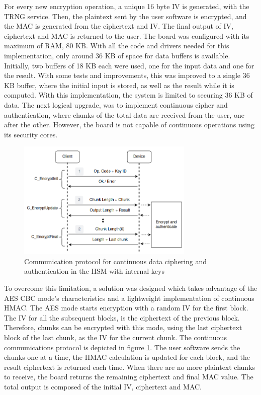 For every new encryption operation, a unique 16 byte \ac{IV} is generated, with the \ac{TRNG} service.
Then, the plaintext sent by the user software is encrypted, and the MAC is generated from the ciphertext and IV. The final output of IV, ciphertext and MAC is returned to the user.
The board was configured with its maximum of RAM, 80 KB. With all the code and drivers needed for this implementation, only around 36 KB of space for data buffers is available. Initially, two buffers of 18 KB each were used, one for the input data and one for the result. With some tests and improvements, this was improved to a single 36 KB buffer, where the initial input is stored, as well as the result while it is computed. With this implementation, the system is limited to securing 36 KB of data. The next logical upgrade, was to implement continuous cipher and authentication, where chunks of the total data are received from the user, one after the other. However, the board is not capable of continuous operations using its security cores.
\begin{figure}[h!]
	\centering
	\includegraphics[width=0.75\textwidth]{./Images/data-exchange-chunks.png}
	\caption{Communication protocol for continuous data ciphering and authentication in the HSM with internal keys}
	\label{fig:protocol:data-exchange-chunks}
\end{figure}
To overcome this limitation, a solution was designed which takes advantage of the AES \ac{CBC} mode's characteristics and a lightweight implementation of continuous \ac{HMAC}. The \ac{AES} mode starts encryption with a random IV for the first block. The IV for all the subsequent blocks, is the ciphertext of the previous block. Therefore, chunks can be encrypted with this mode, using the last ciphertext block of the last chunk, as the IV for the current chunk. The continuous communications protocol is depicted in figure \ref{fig:protocol:data-exchange-chunks}. The user software sends the chunks one at a time, the HMAC calculation is updated for each block, and the result ciphertext is returned each time. When there are no more plaintext chunks to receive, the board returns the remaining ciphertext and final MAC value. The total output is composed of the initial IV, ciphertext and MAC.
